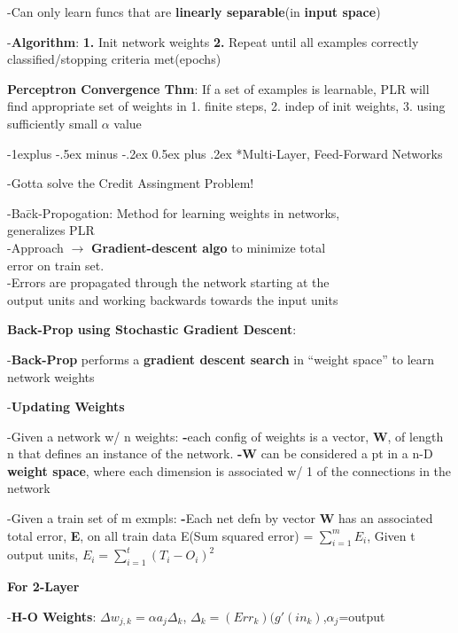 \documentclass[10pt,landscape]{article}
\makeatletter
\renewcommand{\subsection}{\@startsection{subsection}{2}{0mm}%
                                {-1explus -.5ex minus -.2ex}%
                                {0.5ex plus .2ex}%
                                {\normalfont\footnotesize\bfseries}}
\makeatother
\begin{document}
\begin{multicols}{3}
-Can only learn funcs that are \textbf{linearly separable}(in \textbf{input space})

-\textbf{Algorithm}: \textbf{1.} Init network weights \textbf{2.} Repeat until all examples correctly classified/stopping criteria met(epochs)

\textbf{Perceptron Convergence Thm}: If a set of examples is learnable, PLR will find appropriate set of weights in 1. finite steps, 2. indep of init weights, 3. using sufficiently small $\alpha$ value

\subsection{*Multi-Layer, Feed-Forward Networks}

-Gotta solve the Credit Assingment Problem!

\begin{tabbing}
-Ba\=ck-Propogation: Method for learning weights in networks, \\
        generalizes PLR\\
\>-Approach $\to$ \textbf{Gradient-descent algo} to minimize total \\\>error on train set. \\
\>-Errors are propagated through the network starting at the \\\>output units and working backwards towards the input units
\end{tabbing}

\textbf{Back-Prop using Stochastic Gradient Descent}:

-\textbf{Back-Prop} performs a \textbf{gradient descent search} in ``weight space'' to learn network weights

-\textbf{Updating Weights}

-Given a network w/ n weights: \textbf{-}each config of weights is a vector, \textbf{W}, of length n that defines an instance of the network. \textbf{-W} can be considered a pt in a n-D \textbf{weight space}, where each dimension is associated w/ 1 of the connections in the network

-Given a train set of m exmpls: \textbf{-}Each net defn by vector \textbf{W} has an associated total error, \textbf{E}, on all train data E(Sum squared error) = $\sum_{i=1}^{m} E_i$, Given t output units, $E_i = \sum_{i=1}^{t} (T_i - O_i)^2$ 

\textbf{For 2-Layer}

-\textbf{H-O Weights}: $\Delta w_{j,k} = \alpha a_j \Delta_k$, $\Delta_k=(Err_k)(g'(in_k)$,$\alpha_j$=output 


\end{multicols}
\end{document}
